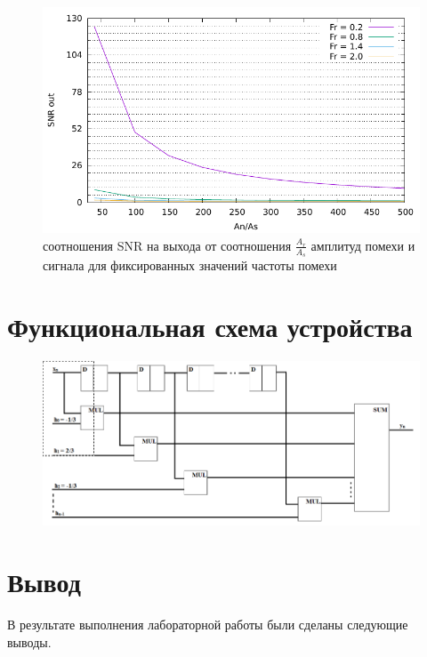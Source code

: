 \documentclass[12pt, a4paper] {ncc}
\begin{document}
        \begin{figure}[H]
            \centering
            \includegraphics[scale=0.9,page=1]{snr_amp.pdf}
			\caption{соотношения SNR на выхода от соотношения $\frac {A_r} {A_s}$ амплитуд помехи и сигнала для фиксированных значений частоты помехи}
        \end{figure}

\section*{Функциональная схема устройства}
        \begin{figure}[H]
            \centering
            \includegraphics[scale=0.5,page=1]{schema.png}
        \end{figure}

\section*{Вывод}

В результате выполнения лабораторной работы были сделаны следующие выводы.
\end{document}
